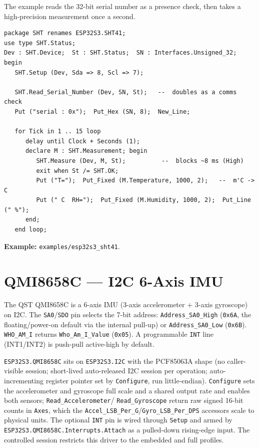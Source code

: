 The example reads the 32-bit serial number as a presence check, then takes a
high-precision measurement once a second.

\begin{lstlisting}
package SHT renames ESP32S3.SHT41;
use type SHT.Status;
Dev : SHT.Device;  St : SHT.Status;  SN : Interfaces.Unsigned_32;
begin
   SHT.Setup (Dev, Sda => 8, Scl => 7);

   SHT.Read_Serial_Number (Dev, SN, St);   --  doubles as a comms check
   Put ("serial : 0x");  Put_Hex (SN, 8);  New_Line;

   for Tick in 1 .. 15 loop
      delay until Clock + Seconds (1);
      declare M : SHT.Measurement; begin
         SHT.Measure (Dev, M, St);          --  blocks ~8 ms (High)
         exit when St /= SHT.OK;
         Put ("T=");  Put_Fixed (M.Temperature, 1000, 2);   --  m'C -> C
         Put (" C  RH=");  Put_Fixed (M.Humidity, 1000, 2);  Put_Line (" %");
      end;
   end loop;
\end{lstlisting}


\noindent\textbf{Example:} \texttt{examples/esp32s3\_sht41}.

\section{QMI8658C --- I2C 6-Axis IMU}
\label{app:ext:qmi8658c}

The QST QMI8658C is a 6-axis IMU (3-axis accelerometer + 3-axis gyroscope) on I2C.
The \texttt{SA0}/\texttt{SDO} pin selects the 7-bit address:
\texttt{Address\_SA0\_High} (\texttt{0x6A}, the floating/power-on default via the
internal pull-up) or \texttt{Address\_SA0\_Low} (\texttt{0x6B}).
\texttt{WHO\_AM\_I} returns \texttt{Who\_Am\_I\_Value} (\texttt{0x05}). A
programmable \texttt{INT} line (INT1/INT2) is push-pull active-high by default.

\texttt{ESP32S3.QMI8658C} sits on \texttt{ESP32S3.I2C} with the PCF85063A shape (no
caller-visible session; short-lived auto-released I2C session per operation;
auto-incrementing register pointer set by \texttt{Configure}, run little-endian).
\texttt{Configure} sets the accelerometer and gyroscope full scale and a shared
output rate and enables both sensors; \texttt{Read\_Accelerometer}/%
\texttt{Read\_Gyroscope} return raw signed 16-bit counts in \texttt{Axes}, which
the \texttt{Accel\_LSB\_Per\_G}/\texttt{Gyro\_LSB\_Per\_DPS} accessors scale to
physical units. The optional \texttt{INT} pin is wired through \texttt{Setup} and
armed by \texttt{ESP32S3.QMI8658C.Interrupts.Attach} as a pulled-down rising-edge
input. The controlled session restricts this driver to the embedded and full
profiles.


